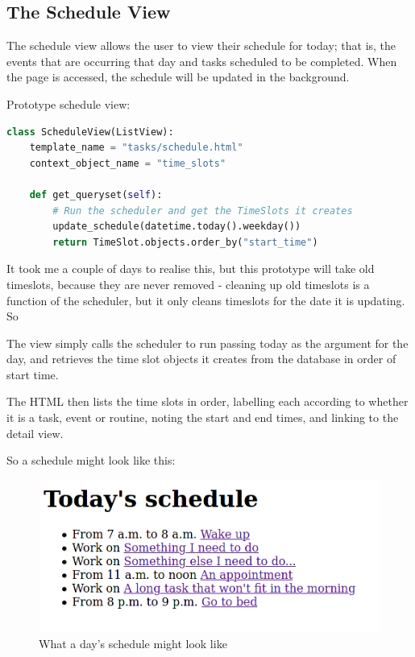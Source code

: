\documentclass{article}
\begin{document}
\subsection{The Schedule View}
The schedule view allows the user to view their schedule for today;
that is,
the events that are occurring that day and tasks scheduled to be completed.
When the page is accessed,
the schedule will be updated in the background.

Prototype schedule view:
\begin{lstlisting}[language=Python]
class ScheduleView(ListView):
    template_name = "tasks/schedule.html"
    context_object_name = "time_slots"

    def get_queryset(self):
        # Run the scheduler and get the TimeSlots it creates
        update_schedule(datetime.today().weekday())
        return TimeSlot.objects.order_by("start_time")
\end{lstlisting}

It took me a couple of days to realise this,
but this prototype will take old timeslots,
because they are never removed -
cleaning up old timeslots is a function of the scheduler,
but it only cleans timeslots for the date it is updating.
So

The view simply calls the scheduler to run passing today as the argument for the day,
and retrieves the time slot objects it creates from the database in order of start time.

The HTML then lists the time slots in order,
labelling each according to whether it is a task, event or routine,
noting the start and end times,
and linking to the detail view.

So a schedule might look like this:
\begin{figure}[H]
	\centering
	\includegraphics[width=\linewidth]{Screenshots/example_schedule.png}
	\caption{What a day's schedule might look like}
	\label{fig:schedule1}
\end{figure}
\end{document}
